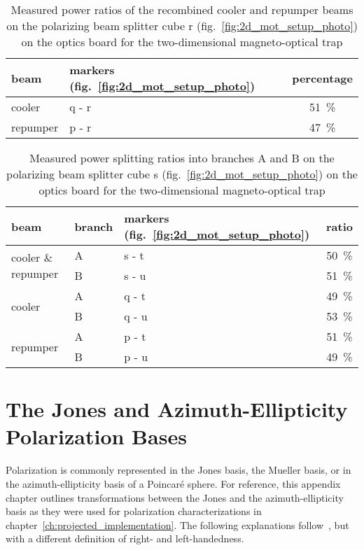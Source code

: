 \begin{table}[h]
    \centering
    \begin{tabular}{llc}
        \toprule
        \textbf{beam} & \textbf{markers} (fig.~\ref{fig:2d_mot_setup_photo}) & \textbf{percentage} \\
        \toprule
        cooler & q - r & \SI{51}{\percent} \\
        repumper & p - r & \SI{47}{\percent} \\
        \bottomrule
    \end{tabular}
    \caption{Measured power ratios of the recombined cooler and repumper beams on the polarizing beam splitter cube r (fig.~\ref{fig:2d_mot_setup_photo}) on the optics board for the two-dimensional magneto-optical trap}
    \label{tab:power_recombination}
\end{table}

\begin{table}[h]
    \centering
    \begin{tabular}{lllc}
        \toprule
        \textbf{beam} & \textbf{branch} & \textbf{markers} (fig.~\ref{fig:2d_mot_setup_photo}) & \textbf{ratio} \\
        \toprule
        \multirow{2}{*}{cooler \& repumper} & A & s - t & \SI{50}{\percent} \\
        & B & s - u & \SI{51}{\percent} \\
        \midrule
        \multirow{2}{*}{cooler} & A & q - t & \SI{49}{\percent} \\
        & B & q - u & \SI{53}{\percent} \\
        \midrule
        \multirow{2}{*}{repumper} & A & p - t & \SI{51}{\percent} \\
        & B & p - u & \SI{49}{\percent} \\
        \bottomrule
    \end{tabular}
    \caption{Measured power splitting ratios into branches A and B on the polarizing beam splitter cube s (fig.~\ref{fig:2d_mot_setup_photo}) on the optics board for the two-dimensional magneto-optical trap}
    \label{tab:power_splitting}
\end{table}



\chapter{The Jones and Azimuth-Ellipticity Polarization Bases}\label{ch:pypol_trafos}
Polarization is commonly represented in the Jones basis, the Mueller basis, or in the azimuth-ellipticity basis of a Poincaré sphere. For reference, this appendix chapter outlines transformations between the Jones and the azimuth-ellipticity basis as they were used for polarization characterizations in chapter~\ref{ch:projected_implementation}. The following explanations follow~\cite{trager_springer_2012}, but with a different definition of right- and left-handedness.

